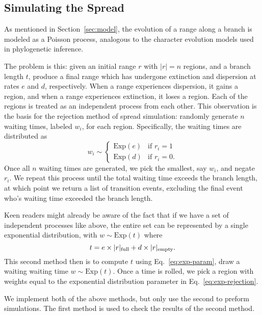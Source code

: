 \documentclass{article}
\begin{document}
\subsection{Simulating the Spread}

As mentioned in Section~\ref{sec:model}, the evolution of a range along a
branch is modeled as a Poisson process, analogous to the character evolution
models used in phylogenetic inference.

The problem is this: given an initial range \( r \) with \( |r| = n \) regions,
and a branch length \( t \), produce a final range which has undergone
extinction and dispersion at rates \( e \) and \( d \), respectively.
When a range experiences dispersion, it gains a region, and when a range
experiences extinction, it loses a region. 
Each of the regions is treated as an independent process from each other.
This observation is the basis for the rejection method of spread simulation:
randomly generate \( n \) waiting times, labeled \( w_i \), for each region.
Specifically, the waiting times are distributed as
\begin{equation}
	\label{eq:exp-rejection} w_i \sim
	\begin{cases}
		\text{Exp}(e) & \text{if } r_i
		= 1                            \\ \text{Exp}(d) & \text{if } r_i = 0.
	\end{cases}
\end{equation}
Once all $n$ waiting times are generated, we pick the smallest, say $w_i$, and
negate $r_i$.
We repeat this process until the total waiting time exceeds the branch length,
at which point we return a list of transition events, excluding the final event
who's waiting time exceeded the branch length.

Keen readers might already be aware of the fact that if we have a set of
independent processes like above, the entire set can be represented by a single
exponential distribution, with \(w \sim \text{Exp}(t) \) where
\begin{equation}
	\label{eq:exp-param} t = e \times |r|_\text{full} + d \times |r|_\text{empty}.
\end{equation}
This second method then is to compute \( t \) using Eq.~\ref{eq:exp-param},
draw a waiting waiting time \( w \sim \text{Exp}(t) \).
Once a time is rolled, we pick a region with weights equal to the exponential
distribution parameter in Eq.~\ref{eq:exp-rejection}.

We implement both of the above methods, but only use the second to preform
simulations.
The first method is used to check the results of the second method.
\end{document}
